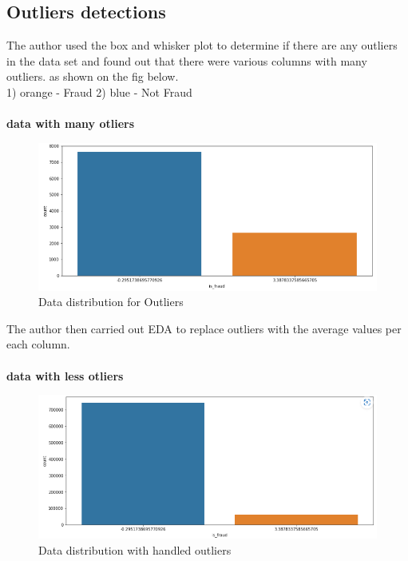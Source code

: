 \subsection{Outliers detections}
The author used the box and whisker plot to determine if there are any outliers in the data set and found out that there
were various columns with many outliers. as shown on the fig below.\\
1) orange - Fraud   2) blue - Not Fraud\\\\
\textbf{data with many otliers\\}
\begin{figure}[h]
    \centering
    \includegraphics[width=0.7\linewidth]{image5}
    \caption{Data distribution for Outliers}
    \label{fig:example}
\end{figure}
\newpage
The author then carried out EDA to replace outliers with the average values per each column.\\\\
\textbf{data with less otliers\\}
\begin{figure}[h]
    \centering
    \includegraphics[width=0.7\linewidth]{image6}
    \caption{Data distribution with handled outliers}
    \label{fig:example}
\end{figure}
